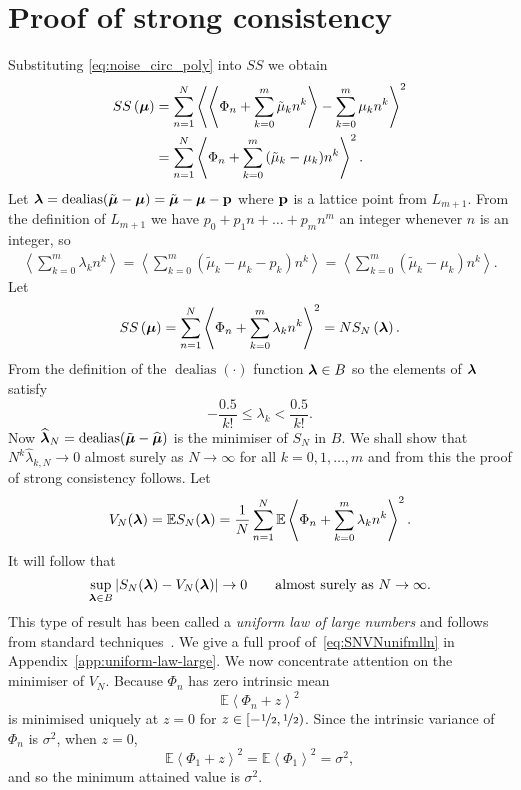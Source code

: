\documentclass[aap]{imsart}
\newcommand{\expect}{{\mathbb E}}
\newcommand{\dealias}{\operatorname{dealias}}
\newcommand{\fracpart}[1]{\left\langle #1 \right\rangle}
\newcommand{\sabs}[1]{\vert #1 \vert}
\begin{document}
\section{Proof of strong consistency}\label{sec:strongconstproof}
 Substituting \eqref{eq:noise_circ_poly} into $SS$ we obtain
 \begin{align*}
SS\left( \mubf \right) &= \sum_{n=1}^{N}\fracpart{ \fracpart{ \Phi_n + \sum_{k = 0}^{m}{\tilde{\mu}_k n^k} } - \sum_{k = 0}^{m}{\mu_k n^k} }^{2} \\
&= \sum_{n=1}^{N}\fracpart{  \Phi_n + \sum_{k = 0}^{m}{(\tilde{\mu}_k - \mu_k) n^k} }^{2}.
\end{align*}
Let $\lambdabf = \dealias(\tilde{\mubf} - \mubf) = \tilde{\mubf} - \mubf - \pbf$ where $\mathbf{p}$ is a lattice point from $L_{m+1}$. From the definition of $L_{m+1}$ we have $p_0 + p_1 n + \dots + p_{m} n^m$ an integer whenever $n$ is an integer, so
\begin{align*}
\fracpart{\sum_{k=0}^{m}\lambda_k n^k } = \fracpart{\sum_{k=0}^{m}(\tilde{\mu}_k - \mu_k - p_k) n^k } = \fracpart{\sum_{k=0}^{m}(\tilde{\mu}_k - \mu_k) n^k }.
\end{align*}
Let
\[
SS\left( \mubf \right) = \sum_{n=1}^{N}\fracpart{  \Phi_n + \sum_{k = 0}^{m}{\lambda_k n^k} }  ^{2} = N S_{N}\left( \lambdabf \right).
 \]
From the definition of the $\dealias(\cdot)$ function $\boldsymbol{\lambda} \in B$ so the elements of $\boldsymbol{\lambda}$ satisfy
 \begin{equation} \label{eq:identifiability}
 -\frac{0.5}{k!} \leq \lambda_k < \frac{0.5}{k!}.
 \end{equation} 
Now $\widehat{\lambdabf}_N = \dealias(\tilde{\mubf} - \widehat{\mubf})$ is the minimiser of $S_{N}$ in $B$. We shall show that $N^k\widehat{\lambda}_{k,N}\rightarrow0$ almost surely as $N\rightarrow\infty$ for all $k = 0,1, \dots, m$ and from this the proof of strong consistency follows.  Let
\[
V_N(\lambdabf) =  \expect S_N(\lambdabf) = \frac{1}{N}\sum_{n=1}^{N} \expect \fracpart{  \Phi_{n}+\sum_{k = 0}^{m}{\lambda_k n^k}}  ^{2}.
\]
It will follow that
 \begin{equation}\label{eq:SNVNunifmlln}
\sup_{\lambdabf \in B}\sabs{S_N(\lambdabf) - V_N(\lambdabf)} \rightarrow 0 \qquad \text{almost surely as $N\rightarrow\infty$}.  
 \end{equation}
This type of result has been called a \emph{uniform law of large numbers} and follows from standard techniques~\cite{Pollard_conv_stat_proc_1984}.  We give a full proof of~\eqref{eq:SNVNunifmlln} in Appendix~\ref{app:uniform-law-large}.  We now concentrate attention on the minimiser of $V_N$. Because $\Phi_n$ has zero intrinsic mean 
\begin{equation}\label{eq:Efracpartmined}
\expect \fracpart{ \Phi_n + z }^{2}
\end{equation}
is minimised uniquely at $z = 0$ for $z \in [-\nicefrac{1}{2}, \nicefrac{1}{2})$.  Since the intrinsic variance of $\Phi_n$ is $\sigma^2$, when $z = 0$,
\begin{equation}\label{eq:Efracpartphi}
\expect\fracpart{\Phi_1+z}^{2} = \expect\fracpart{\Phi_1}^{2} = \sigma^2,
\end{equation}
and so the minimum attained value is $\sigma^2$.
\end{document}
